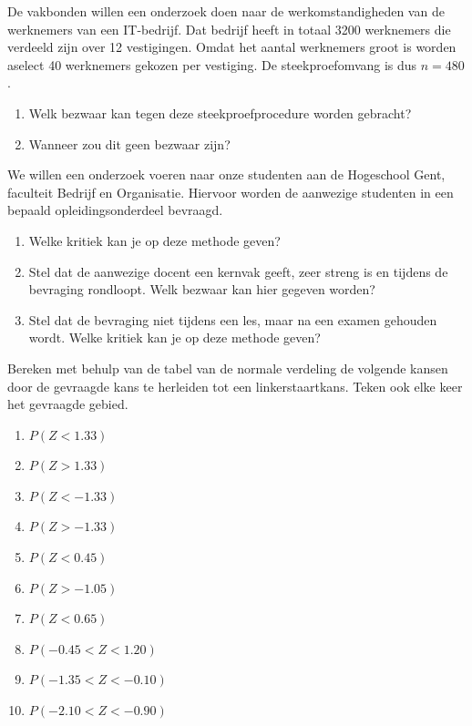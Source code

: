 {\begin{exercise}
  	De vakbonden willen een onderzoek doen naar de werkomstandigheden van de werknemers van een IT-bedrijf. Dat bedrijf heeft in totaal 3200 werknemers die verdeeld zijn over 
  12 vestigingen. Omdat het aantal werknemers groot is worden aselect 40 werknemers gekozen per vestiging. De steekproefomvang is dus $n = 480$.	
  \begin{enumerate}[label=\alph*.]
    \item Welk bezwaar kan tegen deze steekproefprocedure worden gebracht?
    \item Wanneer zou dit geen bezwaar zijn?
  \end{enumerate}
\end{exercise}

\begin{exercise}
  We willen een onderzoek voeren naar onze studenten aan de Hogeschool Gent, faculteit Bedrijf en Organisatie. Hiervoor worden de aanwezige studenten in een bepaald opleidingsonderdeel bevraagd.
  
  \begin{enumerate}[label=\alph*.]
    \item Welke kritiek kan je op deze methode geven?
    \item Stel dat de aanwezige docent een kernvak geeft, zeer streng is en tijdens de bevraging rondloopt. Welk bezwaar kan hier gegeven worden?
    \item Stel dat de bevraging niet tijdens een les, maar na een examen gehouden wordt. Welke kritiek kan je op deze methode geven?
  \end{enumerate}
\end{exercise}

\begin{exercise}
  Bereken met behulp van de tabel van de normale verdeling de volgende kansen door de gevraagde kans te herleiden tot een linkerstaartkans. Teken ook elke keer het gevraagde gebied.
  \begin{enumerate}[label=\alph*.]
    \item $P(Z < 1.33)$
    \item $P(Z > 1.33)$
    \item $P(Z < -1.33)$
    \item $P(Z > -1.33)$
    \item $P(Z < 0.45)$
    \item $P(Z > -1.05)$
    \item $P(Z < 0.65)$
    \item $P(-0.45 < Z < 1.20)$
    \item $P(-1.35 < Z < -0.10)$
    \item $P(-2.10 < Z < -0.90)$
  \end{enumerate}
\end{exercise}

}
